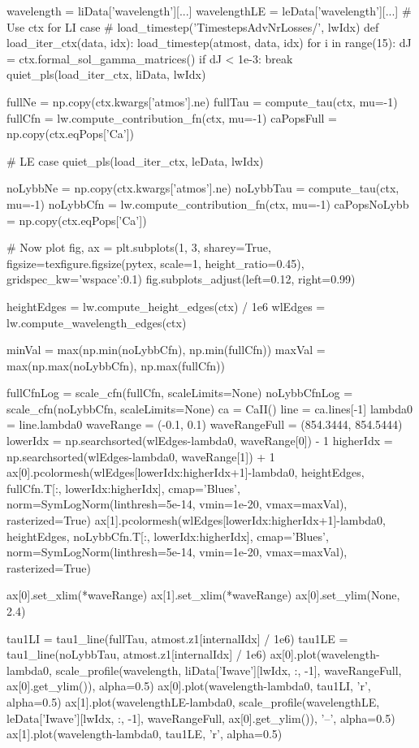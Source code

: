 \begin{pycode}[TimeDepRT]
    wavelength = liData['wavelength'][...]
    wavelengthLE = leData['wavelength'][...]
    # Use ctx for LI case
#     load_timestep('TimestepsAdvNrLosses/', lwIdx)
    def load_iter_ctx(data, idx):
        load_timestep(atmost, data, idx)
        for i in range(15):
            dJ = ctx.formal_sol_gamma_matrices()
            if dJ < 1e-3:
                break
    quiet_pls(load_iter_ctx, liData, lwIdx)

    fullNe = np.copy(ctx.kwargs['atmos'].ne)
    fullTau = compute_tau(ctx, mu=-1)
    fullCfn = lw.compute_contribution_fn(ctx, mu=-1)
    caPopsFull = np.copy(ctx.eqPops['Ca'])

    # LE case
    quiet_pls(load_iter_ctx, leData, lwIdx)

    noLybbNe = np.copy(ctx.kwargs['atmos'].ne)
    noLybbTau = compute_tau(ctx, mu=-1)
    noLybbCfn = lw.compute_contribution_fn(ctx, mu=-1)
    caPopsNoLybb = np.copy(ctx.eqPops['Ca'])

    # Now plot
    fig, ax = plt.subplots(1, 3, sharey=True, figsize=texfigure.figsize(pytex, scale=1, height_ratio=0.45),
    gridspec_kw={'wspace':0.1})
    fig.subplots_adjust(left=0.12, right=0.99)

    heightEdges = lw.compute_height_edges(ctx) / 1e6
    wlEdges = lw.compute_wavelength_edges(ctx)

    minVal = max(np.min(noLybbCfn), np.min(fullCfn))
    maxVal = max(np.max(noLybbCfn), np.max(fullCfn))

    fullCfnLog = scale_cfn(fullCfn, scaleLimits=None)
    noLybbCfnLog = scale_cfn(noLybbCfn, scaleLimits=None)
    ca = CaII()
    line = ca.lines[-1]
    lambda0 = line.lambda0
    waveRange = (-0.1, 0.1)
    waveRangeFull = (854.3444, 854.5444)
    lowerIdx = np.searchsorted(wlEdges-lambda0, waveRange[0]) - 1
    higherIdx = np.searchsorted(wlEdges-lambda0, waveRange[1]) + 1
    ax[0].pcolormesh(wlEdges[lowerIdx:higherIdx+1]-lambda0, heightEdges, fullCfn.T[:, lowerIdx:higherIdx], cmap='Blues', norm=SymLogNorm(linthresh=5e-14, vmin=1e-20, vmax=maxVal), rasterized=True)
    ax[1].pcolormesh(wlEdges[lowerIdx:higherIdx+1]-lambda0, heightEdges, noLybbCfn.T[:, lowerIdx:higherIdx], cmap='Blues', norm=SymLogNorm(linthresh=5e-14, vmin=1e-20, vmax=maxVal), rasterized=True)

    ax[0].set_xlim(*waveRange)
    ax[1].set_xlim(*waveRange)
    ax[0].set_ylim(None, 2.4)

    tau1LI = tau1_line(fullTau, atmost.z1[internalIdx] / 1e6)
    tau1LE = tau1_line(noLybbTau, atmost.z1[internalIdx] / 1e6)
    ax[0].plot(wavelength-lambda0, scale_profile(wavelength, liData['Iwave'][lwIdx, :, -1], waveRangeFull, ax[0].get_ylim()), alpha=0.5)
    ax[0].plot(wavelength-lambda0, tau1LI, 'r', alpha=0.5)
    ax[1].plot(wavelengthLE-lambda0, scale_profile(wavelengthLE, leData['Iwave'][lwIdx, :, -1], waveRangeFull, ax[0].get_ylim()), '--', alpha=0.5)
    ax[1].plot(wavelength-lambda0, tau1LE, 'r', alpha=0.5)


\end{pycode}
